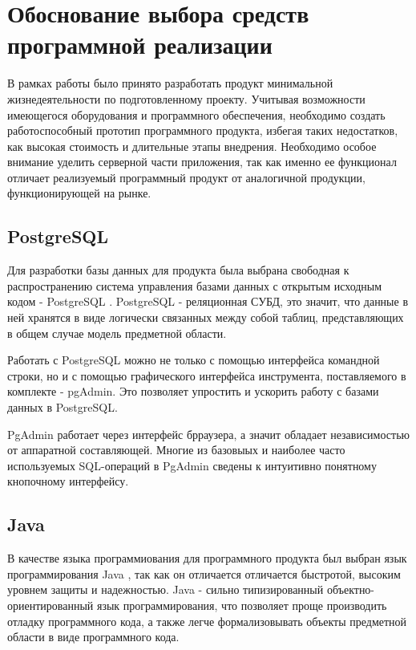 \section{Обоснование выбора средств программной реализации}

В рамках работы было принято разработать продукт минимальной жизнедеятельности по подготовленному проекту. 
Учитывая возможности имеющегося оборудования и программного обеспечения, необходимо создать работоспособный прототип программного продукта, избегая таких недостатков, как высокая стоимость и длительные этапы внедрения.
Необходимо особое внимание уделить серверной части приложения, так как именно ее функционал отличает реализуемый программный продукт от аналогичной продукции, функционирующей на рынке.

\subsection{PostgreSQL}

Для разработки базы данных для продукта была выбрана свободная к распространению система управления базами данных с открытым исходным кодом - PostgreSQL \cite{postgresql-doc}.
PostgreSQL - реляционная СУБД, это значит, что данные в ней хранятся в виде логически связанных между собой таблиц, представляющих в общем случае модель предметной области.

Работать с PostgreSQL можно не только с помощью интерфейса командной строки, но и с помощью графического интерфейса инструмента, поставляемого в комплекте - pgAdmin. 
Это позволяет упростить и ускорить работу с базами данных в PostgreSQL.

PgAdmin работает через интерфейс брраузера, а значит обладает независимостью от аппаратной составляющей.
Многие из базовыых и наиболее часто используемых SQL-операций в PgAdmin сведены к интуитивно понятному кнопочному интерфейсу.

\subsection{Java}

В качестве языка программиования для программного продукта был выбран язык программирования Java \cite{java-doc}, так как он отличается отличается быстротой, высоким уровнем защиты и надежностью.
Java - сильно типизированный объектно-ориентированный язык программирования, что позволяет проще производить отладку программного кода, а также легче формализовывать объекты предметной области в виде программного кода.

